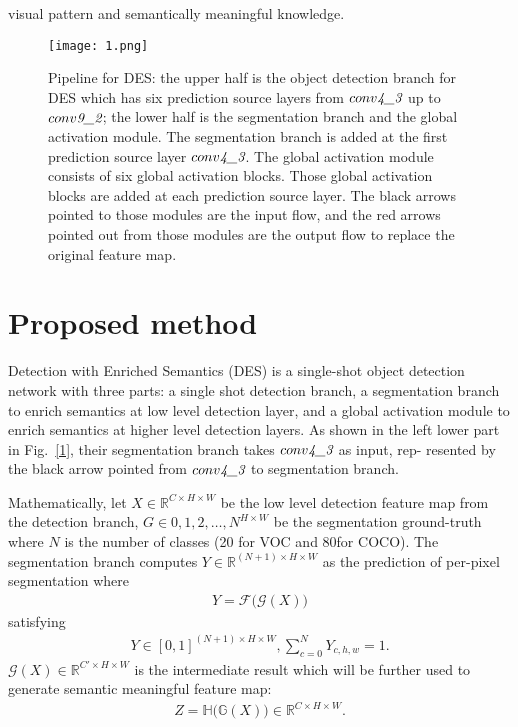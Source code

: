\documentclass[10pt,twocolumn,letterpaper]{article}
\begin{document}
visual pattern and semantically meaningful knowledge.
\begin{figure*}
	\begin{center}
		\texttt{[image: 1.png]}\\
		\caption{Pipeline for DES: the upper half is the object detection branch for DES which has six prediction source layers from $conv\emph{4\_3}$
			up to $conv\emph{9\_2}$; the lower half is the segmentation branch and the global activation module. The segmentation branch is added at the first
			prediction source layer $conv\emph{4\_3}$. The global activation module consists of six global activation blocks. Those global activation blocks are
			added at each prediction source layer. The black arrows pointed to those modules are the input flow, and the red arrows pointed out from
			those modules are the output flow to replace the original feature map.}\label{2}
	\end{center}
\end{figure*}
\section{Proposed method}
Detection with Enriched Semantics (DES) is a single-shot object detection network with three parts: a single shot detection branch, a segmentation branch to enrich semantics at low level detection layer, and a global activation module to enrich semantics at higher level detection layers. As shown in the left lower part in Fig.~\ref{1}, their segmentation branch takes $conv\emph{4\_3}$ as input, rep-
resented by the black arrow pointed from $conv\emph{4\_3}$ to segmentation branch.
\par 
Mathematically, let $X\in\mathbb{R}^{C\times H\times W}$ be the low level
detection feature map from the detection branch, $G\in{0,1,2,\dots,N}^{H\times W}$ be the segmentation ground-truth where $N$ is the number of classes (20 for VOC and 80for COCO). The segmentation branch computes $Y\in\mathbb{R}^{(N+1)\times H\times W}$ as the prediction of per-pixel segmentation where
\begin{equation}\label{11}
\begin{split}
Y=\mathcal{F(G}(X))
\end{split}
\end{equation}
satisfying
\begin{equation}\label{12}
\begin{split}
Y\in [0,1]^{(N+1)\times H\times W},\sum^N_{c=0}Y_{c,h,w}=1.
\end{split}
\end{equation}
$\mathcal{G}(X)\in\mathbb{R}^{C'\times H\times W}$ is the intermediate result which will be further used to generate semantic meaningful feature map:
\begin{equation}\label{13}
\begin{split}
Z=\mathbb{H(G}(X))\in\mathbb{R}^{C\times H\times W}.
\end{split}
\end{equation}
\end{document}
